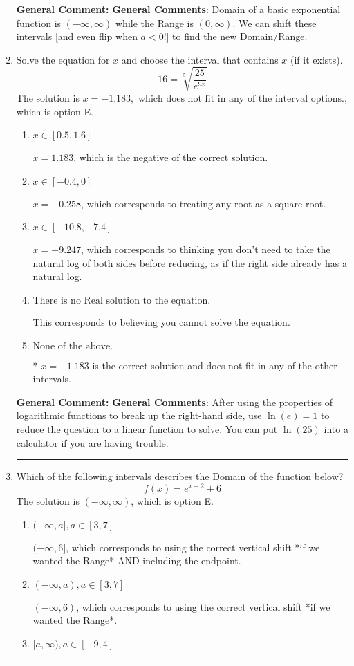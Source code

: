 \documentclass{extbook}[14pt]
\newcommand{\litem}[1]{\item #1

\rule{\textwidth}{0.4pt}}
\begin{document}
\begin{enumerate}
{\textbf{General Comment:} \textbf{General Comments}: Domain of a basic exponential function is $(-\infty, \infty)$ while the Range is $(0, \infty)$. We can shift these intervals [and even flip when $a<0$!] to find the new Domain/Range.
}
\litem{
 Solve the equation for $x$ and choose the interval that contains $x$ (if it exists).
\[  16 = \sqrt[5]{\frac{25}{e^{9x}}} \]The solution is \( x = -1.183, \text{ which does not fit in any of the interval options.} \), which is option E.\begin{enumerate}[label=\Alph*.]
\item \( x \in [0.5, 1.6] \)

$x = 1.183$, which is the negative of the correct solution.
\item \( x \in [-0.4, 0] \)

$x = -0.258$, which corresponds to treating any root as a square root.
\item \( x \in [-10.8, -7.4] \)

$x = -9.247$, which corresponds to thinking you don't need to take the natural log of both sides before reducing, as if the right side already has a natural log.
\item \( \text{There is no Real solution to the equation.} \)

This corresponds to believing you cannot solve the equation.
\item \( \text{None of the above.} \)

* $x = -1.183$ is the correct solution and does not fit in any of the other intervals.
\end{enumerate}

\textbf{General Comment:} \textbf{General Comments}: After using the properties of logarithmic functions to break up the right-hand side, use $\ln(e) = 1$ to reduce the question to a linear function to solve. You can put $\ln(25)$ into a calculator if you are having trouble.
}
\litem{
Which of the following intervals describes the Domain of the function below?
\[ f(x) = e^{x-2}+6 \]The solution is \( (-\infty, \infty) \), which is option E.\begin{enumerate}[label=\Alph*.]
\item \( (-\infty, a], a \in [3, 7] \)

$(-\infty, 6]$, which corresponds to using the correct vertical shift *if we wanted the Range* AND including the endpoint.
\item \( (-\infty, a), a \in [3, 7] \)

$(-\infty, 6)$, which corresponds to using the correct vertical shift *if we wanted the Range*.
\item \( [a, \infty), a \in [-9, 4] \)


\end{enumerate}}
\end{enumerate}
\end{document}
